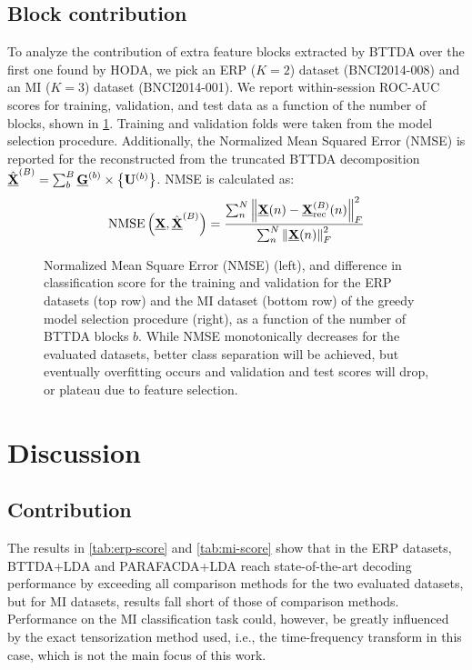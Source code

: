 \subsection{Block contribution}
To analyze the contribution of extra feature blocks extracted by BTTDA over
the first one found by HODA, we pick an ERP ($K=2$) dataset
(BNCI2014-008) and an MI ($K=3$) dataset (BNCI2014-001).
We report within-session ROC-AUC scores for training, validation, and test data as a function
of the number of blocks, shown in \cref{fig:blocks}.
Training and validation folds were taken from the model selection procedure.
Additionally, the Normalized Mean Squared Error (NMSE) is reported for the
reconstructed from the truncated BTTDA decomposition
$\textstyle{\hat{\underline{\mathbf{X}}}^{(B)}=\sum_b^B\underline{\mathbf{G}}^{(b)}\times\left\{\mathbf{U}^{(b)}\right\}}$.
NMSE is calculated as:
\begin{equation}
  \operatorname{NMSE}\left(\underline{\mathbf{X}}, \hat{\underline{\mathbf{X}}}^{(B)}\right) =
	\frac{\sum_n^N\left\lVert\underline{\mathbf{X}}(n)-\underline{\mathbf{X}}_\text{rec}^{(B)}(n)\right\rVert_F^2}
	{\sum_n^N\left\lVert\underline{\mathbf{X}}(n)\right\rVert_F^2}
\end{equation}
\begin{figure}[t]
  \sffamily
	
  \caption[Analysis of NMSE and classification score per block.]{%
    Normalized Mean Square Error (NMSE) (left), and difference in
    classification score for the training and validation for the ERP datasets
    (top row) and the MI dataset (bottom row)	of the greedy model selection
    procedure (right), as a function of the number of BTTDA blocks $b$.
		While NMSE monotonically decreases for the evaluated datasets, better class
		separation will be achieved, but eventually overfitting occurs and validation
		and test scores will drop, or plateau due to feature selection.
	}
	\label{fig:blocks}
\end{figure}

\section{Discussion}
\subsection{Contribution}
The results in \cref{tab:erp-score} and \autoref{tab:mi-score} show that
in the ERP datasets, BTTDA+LDA and PARAFACDA+LDA reach state-of-the-art decoding performance by
exceeding all comparison methods for the two evaluated datasets, but
for MI datasets, results fall short of those of comparison methods.
Performance on the MI classification task could, however, be greatly influenced
by the exact tensorization method used, i.e., the time-frequency transform in
this case, which is not the main focus of this work.

